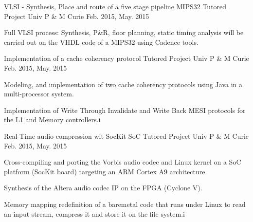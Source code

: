 

\begin{cventries}

  \cventry
    {VLSI - Synthesis, Place and route of a five stage pipeline MIPS32}%
    {Tutored Project} %
    {Univ P \& M Curie} %
    {Feb. 2015, May. 2015} %
    {
      \begin{cvitems} %
	\item {Full VLSI process: Synthesis, P\&R, floor planning, static timing analysis will be carried out on the VHDL code of a MIPS32 using Cadence tools.}
      \end{cvitems} 
    }

  \cventry
    {Implementation of a cache coherency protocol}%
    {Tutored Project} %
    {Univ P \& M Curie} %
    {Feb. 2015, May. 2015} %
    {
      \begin{cvitems} %
	\item {Modeling, and implementation of two cache coherency protocols using Java in a multi-processor system.}
	\item {Implementation of Write Through Invalidate and Write Back MESI protocols for the L1 and Memory controllers.i}
      \end{cvitems} 
    }

  \cventry
    {Real-Time audio compression wit SocKit SoC}%
    {Tutored Project} %
    {Univ P \& M Curie} %
    {Feb. 2015, May. 2015} %
    {
      \begin{cvitems} %
	\item {Cross-compiling and porting the Vorbis audio codec and Linux kernel on a SoC platform (SocKit board) targeting an ARM Cortex A9 architecture.}
	\item {Synthesis of the Altera audio codec IP on the FPGA (Cyclone V).}
	\item {Memory mapping redefinition of a baremetal code that runs under Linux to read an input stream, compress it and store it on the file system.i}
      \end{cvitems}
    }


\end{cventries}
